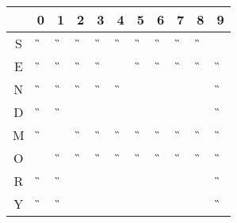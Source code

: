 \begin{tabular}{|c|c|c|c|c|c|c|c|c|c|c|}\hline
  & 0 & 1 & 2 & 3 & 4 & 5 & 6 & 7 & 8 & 9 \\ \hline
S &\G &\G &\G &\G &\G &\G &\G &\G &\G &\A \\ \hline
E &\G &\G &\G &\G &\A &\G &\G &\G &\G &\G \\ \hline
N &\G &\G &\G &\G &\G &\F &\X &\X &\X &\G \\ \hline
D &\G &\G &\X &\X &\X &\X &\X &\X &\F &\G \\ \hline
M &\G &\A &\G &\G &\G &\G &\G &\G &\G &\G \\ \hline
O &\A &\G &\G &\G &\G &\G &\G &\G &\G &\G \\ \hline
R &\G &\G &\X &\X &\X &\X &\X &\X &\F &\G \\ \hline
Y & \G&\G &\F &\X &\X &\X &\X &\X &\X &\G \\ \hline
\end{tabular}

